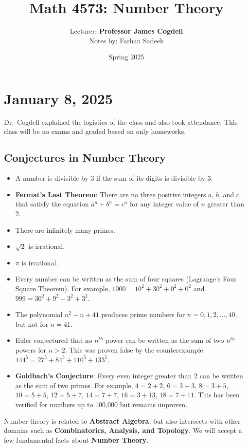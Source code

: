 \documentclass[11pt]{article}
\title{Math 4573: Number Theory}
\author{Lecturer: \textbf{Professor James Cogdell}\\Notes by: Farhan Sadeek}
\date{Spring 2025}
\begin{document}
\maketitle

\section{January 8, 2025}

Dr.\ Cogdell explained the logistics of the class and also took attendance.
This class will be no exams and graded based on only homeworks.

\subsection{Conjectures in Number Theory}
\begin{itemize}
	\item A number is divisible by 3 if the sum of its digits is divisible by 3.
	\item \textbf{Fermat's Last Theorem}: There are no three positive integers $a$, $b$, and $c$ that satisfy the equation $a^n + b^n = c^n$ for any integer value of $n$ greater than 2.
	\item There are infinitely many primes.
	\item $\sqrt{2}$ is irrational.
	\item $\pi$ is irrational.
	\item Every number can be written as the sum of four squares (Lagrange's Four Square
	      Theorem). For example, $1000 = 10^2 + 30^2 + 0^2 + 0^2$ and $999 = 30^2 + 9^2 +
		      3^2 + 3^2$.
	\item The polynomial $n^2 - n + 41$ produces prime numbers for $n = 0, 1, 2, \ldots,
		      40$, but not for $n = 41$.
	\item Euler conjectured that no $n^{th}$ power can be written as the sum of two
	      $n^{th}$ powers for $n > 2$. This was proven false by the counterexample $144^5
		      = 27^5 + 84^5 + 110^5 + 133^5$.
	\item \textbf{Goldbach's Conjecture}: Every even integer greater than 2 can be written as the sum of two primes. For example, $4 = 2 + 2$, $6 = 3 + 3$, $8 = 3 + 5$, $10 = 5 + 5$, $12 = 5 + 7$, $14 = 7 + 7$, $16 = 3 + 13$, $18 = 7 + 11$. This has been verified for numbers up to 100,000 but remains unproven.
\end{itemize}

Number theory is related to \textbf{Abstract Algebra}, but also intersects with
other domains such as \textbf{Combinatorics, Analysis, and Topology}. We will
accept a few fundamental facts about \textbf{Number Theory}.
\end{document}
